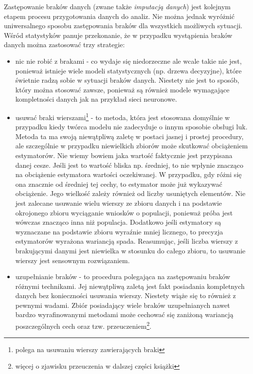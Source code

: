 \documentclass[
]{book}
\providecommand{\tightlist}{%
  \setlength{\itemsep}{0pt}\setlength{\parskip}{0pt}}
\theoremstyle{plain}
\theoremstyle{definition}
\theoremstyle{definition}
\theoremstyle{definition}
\theoremstyle{definition}
\theoremstyle{remark}
\begin{document}
Zastępowanie braków danych (zwane także \emph{imputacją danych}) jest kolejnym etapem procesu przygotowania danych do analiz. Nie można jednak wyróżnić uniwersalnego sposobu zastępowania braków dla wszystkich możliwych sytuacji. Wśród statystyków panuje przekonanie, że w przypadku wystąpienia braków danych można zastosować trzy strategie:

\begin{itemize}
\tightlist
\item
  nic nie robić z brakami - co wydaje się niedorzeczne ale wcale takie nie jest, ponieważ istnieje wiele modeli statystycznych (np. drzewa decyzyjne), które świetnie radzą sobie w sytuacji braków danych. Niestety nie jest to sposób, który można stosować zawsze, ponieważ są również modele wymagające kompletności danych jak na przykład sieci neuronowe.
\item
  usuwać braki wierszami\footnote{polega na usuwaniu wierszy zawierających braki} - to metoda, która jest stosowana domyślnie w przypadku kiedy twórca modelu nie zadecyduje o innym sposobie obsługi luk. Metoda ta ma swoją niewątpliwą zaletę w postaci jasnej i prostej procedury, ale szczególnie w przypadku niewielkich zbiorów może skutkować obciążeniem estymatorów. Nie wiemy bowiem jaka wartość faktycznie jest przypisana danej cesze. Jeśli jest to wartość bliska np. średniej, to nie wpłynie znacząco na obciążenie estymatora wartości oczekiwanej. W przypadku, gdy różni się ona znacznie od średniej tej cechy, to estymator może już wykazywać obciążenie. Jego wielkość zależy również od liczby usuniętych elementów. Nie jest zalecane usuwanie wielu wierszy ze zbioru danych i na podstawie okrojonego zbioru wyciąganie wniosków o populacji, ponieważ próba jest wówczas znacząco inna niż populacja. Dodatkowo jeśli estymatory są wyznaczane na podstawie zbioru wyraźnie mniej licznego, to precyzja estymatorów wyrażona wariancją spada. Reasumując, jeśli liczba wierszy z brakującymi danymi jest niewielka w stosunku do całego zbioru, to usuwanie wierszy jest sensownym rozwiązaniem.
\item
  uzupełnianie braków - to procedura polegająca na zastępowaniu braków różnymi technikami. Jej niewątpliwą zaletą jest fakt posiadania kompletnych danych bez konieczności usuwania wierszy. Niestety wiąże się to również z pewnymi wadami. Zbiór posiadający wiele braków uzupełnianych nawet bardzo wyrafinowanymi metodami może cechować się zaniżoną wariancją poszczególnych cech oraz tzw. przeuczeniem\footnote{więcej o zjawisku przeuczenia w dalszej części książki}.
\end{itemize}
\end{document}
